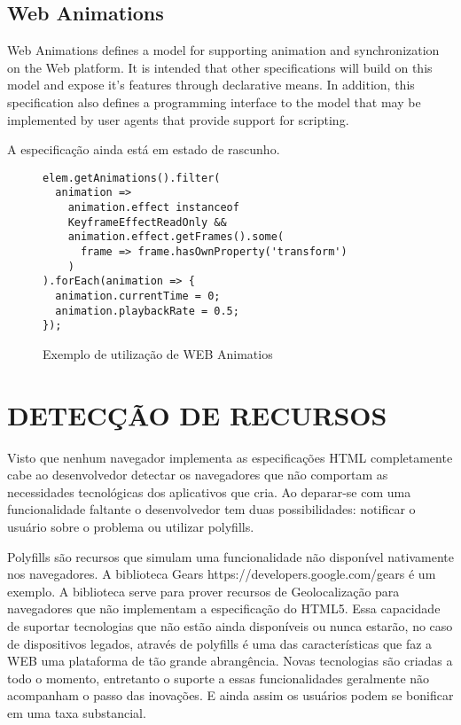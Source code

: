 \subsection{Web Animations}

Web Animations defines a model for supporting animation and synchronization on the Web platform. It is intended that other specifications will build on this model and expose it's features through declarative means. In addition, this specification also defines a programming interface to the model that may be implemented by user agents that provide support for scripting.

A especificação ainda está em estado de rascunho.
\begin{figure}
    \centering
    \begin{verbatim}
elem.getAnimations().filter(
  animation =>
    animation.effect instanceof 
    KeyframeEffectReadOnly &&
    animation.effect.getFrames().some(
      frame => frame.hasOwnProperty('transform')
    )
).forEach(animation => {
  animation.currentTime = 0;
  animation.playbackRate = 0.5;
});
    \end{verbatim}
	\caption{Exemplo de utilização de WEB Animatios}
    \label{fig:webAnimations}
\end{figure}

\section{DETECÇÃO DE RECURSOS}

Visto que nenhum navegador implementa as especificações HTML
completamente cabe ao desenvolvedor detectar os navegadores que não
comportam as necessidades tecnológicas dos aplicativos que cria. Ao
deparar-se com uma funcionalidade faltante o desenvolvedor tem duas
possibilidades: notificar o usuário sobre o problema ou utilizar
polyfills.

Polyfills são recursos que simulam uma funcionalidade não disponível
nativamente nos navegadores. A
biblioteca Gears https://developers.google.com/gears é um exemplo. A biblioteca
serve para prover recursos de Geolocalização para navegadores que não
implementam a especificação do HTML5. Essa capacidade de suportar
tecnologias que não estão ainda disponíveis ou nunca estarão, no caso de dispositivos legados, através de polyfills é
uma das características que faz a WEB uma plataforma de tão grande
abrangência. Novas tecnologias são criadas a todo o momento, entretanto o
suporte a essas funcionalidades geralmente não acompanham o passo das
inovações. E ainda assim os usuários podem se bonificar em uma taxa substancial.

